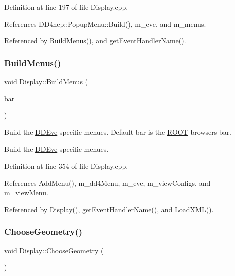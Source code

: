 Definition at line 197 of file Display.\+cpp.



References D\+D4hep\+::\+Popup\+Menu\+::\+Build(), m\+\_\+eve, and m\+\_\+menus.



Referenced by Build\+Menus(), and get\+Event\+Handler\+Name().

\hypertarget{class_d_d4hep_1_1_display_a9b8dbd9769ea14b3489b481ae3361080}{}\label{class_d_d4hep_1_1_display_a9b8dbd9769ea14b3489b481ae3361080} 
\subsubsection{\texorpdfstring{Build\+Menus()}{BuildMenus()}}
{\footnotesize\ttfamily void Display\+::\+Build\+Menus (\begin{DoxyParamCaption}\item[{T\+G\+Menu\+Bar $\ast$}]{bar = {} }\end{DoxyParamCaption})\hspace{0.3cm}{\ttfamily [virtual]}}



Build the \hyperlink{struct_d_d4hep_1_1_d_d_eve}{D\+D\+Eve} specific menues. Default bar is the \hyperlink{namespace_r_o_o_t}{R\+O\+OT} browser\textquotesingle{}s bar. 

Build the \hyperlink{struct_d_d4hep_1_1_d_d_eve}{D\+D\+Eve} specific menues. 

Definition at line 354 of file Display.\+cpp.



References Add\+Menu(), m\+\_\+dd4\+Menu, m\+\_\+eve, m\+\_\+view\+Configs, and m\+\_\+view\+Menu.



Referenced by Display(), get\+Event\+Handler\+Name(), and Load\+X\+M\+L().

\hypertarget{class_d_d4hep_1_1_display_aa6b61d0d86f9307e516996d71b38abfa}{}\label{class_d_d4hep_1_1_display_aa6b61d0d86f9307e516996d71b38abfa} 
\subsubsection{\texorpdfstring{Choose\+Geometry()}{ChooseGeometry()}}
{\footnotesize\ttfamily void Display\+::\+Choose\+Geometry (\begin{DoxyParamCaption}{ }\end{DoxyParamCaption})}




